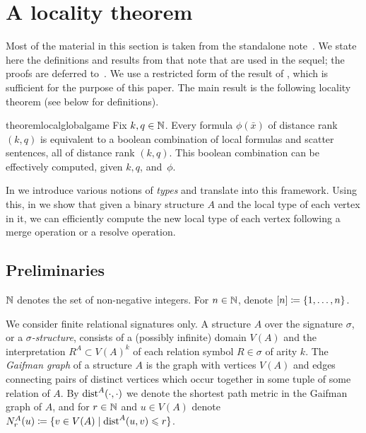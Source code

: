 \section{A locality theorem}\label{sec:logic}
Most of the material in this section is taken from the standalone note~\cite{locality-note}.
We state here the definitions and results from that note that are used in the sequel;
the proofs are deferred to~\cite{locality-note}.
We use a restricted form of the result of \cite{locality-note}, which is sufficient for the purpose of this paper.
The main result is the following locality theorem (see below for definitions).
\begin{restatable}{theorem}{localglobalgame}\label{thm:localglobal}
        Fix $k,q \in \mathbb N$. Every \distFO formula $\phi(\bar x)$ of distance rank $(k,q)$
     is equivalent to a boolean combination of
    local \distFO formulas and \distFO scatter sentences, all of distance rank $(k,q)$.    
    This boolean combination can be effectively computed, given $k,q$, and~$\phi$.
\end{restatable}
In  we introduce various notions of \emph{types} and translate  into this framework.
Using this, in  we show that given a binary structure $A$ and the local type of each vertex in it, we can efficiently compute the new local type of each vertex following a merge operation or a resolve operation.

\subsection{Preliminaries}
 $\mathbb N$ denotes the set of non-negative integers. For $n\in\mathbb N$, denote $[n]\coloneqq\{1,\ldots,n\}$.

We consider finite relational signatures only.
A structure $A$ over the signature $\sigma$,
 or a \emph{$\sigma$-structure}, consists of a (possibly infinite) domain $V(A)$ and the interpretation
  $R^A\subset V(A)^k$ of each relation symbol $R\in \sigma$ of arity $k$.
The \emph{Gaifman graph} of a structure $A$ is the graph with vertices $V(A)$ and edges connecting pairs of distinct vertices which occur together in some tuple of some relation of $A$. By $\mathrm{dist}^A(\cdot,\cdot)$ we denote the shortest path metric  in the Gaifman graph of $A$, and for $r\in\mathbb N$ and $u\in V(A)$ denote $N^A_r(u)\coloneqq\{v\in V(A)\mid\mathrm{dist}^A(u,v)\leqslant r\}$.


